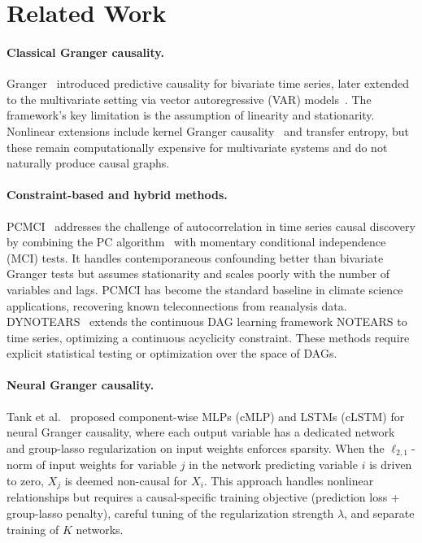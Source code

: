 
\section{Related Work}
\label{sec:related}

\paragraph{Classical Granger causality.}
Granger~\citep{granger1969investigating} introduced predictive causality
for bivariate time series, later extended to the multivariate setting
via vector autoregressive (VAR) models~\citep{lutkepohl2005new}. The
framework's key limitation is the assumption of linearity and stationarity.
Nonlinear extensions include kernel Granger
causality~\citep{marinazzo2008kernel} and transfer entropy, but these
remain computationally expensive for multivariate systems and do not
naturally produce causal graphs.

\paragraph{Constraint-based and hybrid methods.}
PCMCI~\citep{runge2019pcmci} addresses the challenge of autocorrelation
in time series causal discovery by combining the PC
algorithm~\citep{spirtes2000causation} with momentary conditional
independence (MCI) tests. It handles contemporaneous confounding better
than bivariate Granger tests but assumes stationarity and scales poorly
with the number of variables and lags. PCMCI has become the standard
baseline in climate science applications, recovering known teleconnections
from reanalysis data. DYNOTEARS~\citep{pamfil2020dynotears} extends the
continuous DAG learning framework NOTEARS to time series, optimizing a
continuous acyclicity constraint. These methods require explicit
statistical testing or optimization over the space of DAGs.

\paragraph{Neural Granger causality.}
Tank et al.~\citep{tank2021neural} proposed component-wise MLPs (cMLP)
and LSTMs (cLSTM) for neural Granger causality, where each output variable
has a dedicated network and group-lasso regularization on input weights
enforces sparsity. When the $\ell_{2,1}$-norm of input weights for variable
$j$ in the network predicting variable $i$ is driven to zero, $X_j$ is
deemed non-causal for $X_i$. This approach handles nonlinear relationships
but requires a causal-specific training objective (prediction loss +
group-lasso penalty), careful tuning of the regularization strength
$\lambda$, and separate training of $K$ networks.

